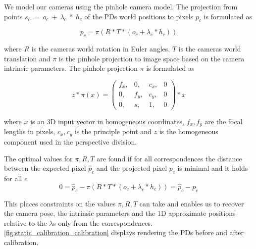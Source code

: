 We model our cameras using the pinhole camera model. 
The projection from points $s_c~=~o_c~+~\lambda_c~*~h_c$ of the PDs world positions to pixels $p_c$ is formulated as

\begin{equation}
  \label{eq:static_calibration_reprojection}
  p_c = \pi \left( R * T * (o_c + \lambda_c * h_c) \right)
\end{equation}

where $R$ is the cameras world rotation in Euler angles, $T$ is the cameras world translation and $\pi$ is the pinhole projection to image space based on the camera intrinsic parameters.
The pinhole projection $\pi$ is formulated as

\begin{equation}
  \label{eq:static_calibration_intrinsic_parameters}
  z * \pi(x) =   
  \begin{pmatrix}
    f_x,& 0,& c_x,& 0\\
    0,& f_y,& c_y,& 0\\
    0,& s,& 1 ,& 0
  \end{pmatrix} * x 
\end{equation}

where $x$ is an 3D input vector in homogeneous coordinates, $f_x, f_y$ are the focal lengths in pixels, $c_x, c_y$ is the principle point and $z$ is the homogeneous component used in the perspective division. 

The optimal values for $\pi,R,T$ are found if for all correspondences the distance between the expected pixel $\hat{p}_c$ and the projected pixel $p_c$ is minimal and it holds for all $c$
\begin{equation}
  0 = \hat{p}_c - \pi \left( R * T * (o_c + \lambda_c * h_c)\right) = \hat{p}_c - p_c
\end{equation}

This places constraints on the values $\pi,R,T$ can take and enables us to recover the camera pose, the intrinsic parameters and the 1D approximate positions relative to the $\lambda$s only from the correspondences.\\
\autoref{fig:static_calibration_calibration} displays rendering the PDs before and after calibration.



